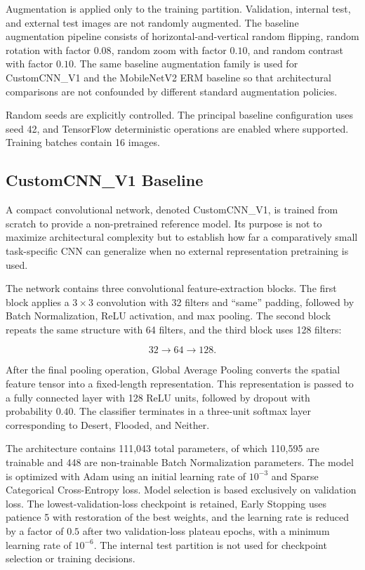 Augmentation is applied only to the training partition. Validation,
internal test, and external test images are not randomly augmented. The
baseline augmentation pipeline consists of horizontal-and-vertical random
flipping, random rotation with factor \(0.08\), random zoom with factor
\(0.10\), and random contrast with factor \(0.10\). The same baseline
augmentation family is used for CustomCNN\_V1 and the MobileNetV2 ERM
baseline so that architectural comparisons are not confounded by different
standard augmentation policies.

Random seeds are explicitly controlled. The principal baseline
configuration uses seed 42, and TensorFlow deterministic operations are
enabled where supported. Training batches contain 16 images.

\subsection{CustomCNN\_V1 Baseline}

A compact convolutional network, denoted CustomCNN\_V1, is trained from
scratch to provide a non-pretrained reference model. Its purpose is not to
maximize architectural complexity but to establish how far a comparatively
small task-specific CNN can generalize when no external representation
pretraining is used.

The network contains three convolutional feature-extraction blocks. The
first block applies a \(3\times3\) convolution with 32 filters and
``same'' padding, followed by Batch Normalization, ReLU activation, and
max pooling. The second block repeats the same structure with 64 filters,
and the third block uses 128 filters:

\[
32 \rightarrow 64 \rightarrow 128.
\]

After the final pooling operation, Global Average Pooling converts the
spatial feature tensor into a fixed-length representation. This
representation is passed to a fully connected layer with 128 ReLU units,
followed by dropout with probability \(0.40\). The classifier terminates
in a three-unit softmax layer corresponding to Desert, Flooded, and
Neither.

The architecture contains 111,043 total parameters, of which 110,595 are
trainable and 448 are non-trainable Batch Normalization parameters. The
model is optimized with Adam using an initial learning rate of \(10^{-3}\)
and Sparse Categorical Cross-Entropy loss. Model selection is based
exclusively on validation loss. The lowest-validation-loss checkpoint is
retained, Early Stopping uses patience 5 with restoration of the best
weights, and the learning rate is reduced by a factor of \(0.5\) after
two validation-loss plateau epochs, with a minimum learning rate of
\(10^{-6}\). The internal test partition is not used for checkpoint
selection or training decisions.

